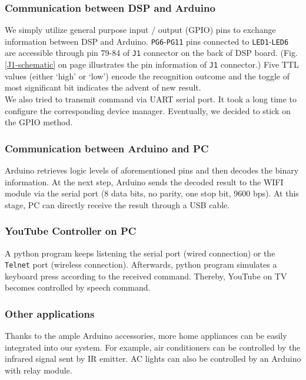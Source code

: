 \subsubsection{Communication between DSP and Arduino}
We simply utilize general purpose input / output (GPIO) pins to exchange information between DSP and Arduino. \texttt{PG6}-\texttt{PG11} pins connected to \texttt{LED1}-\texttt{LED6} are accessible through pin 79-84 of \texttt{J1} connector on the back of DSP board. (Fig. \ref{J1-schematic} on page \pageref{J1-schematic} illustrates the pin information of \texttt{J1} connector.) Five TTL values (either `high' or `low') encode the recognition outcome and the toggle of most significant bit indicates the advent of new result.\\

We also tried to transmit command via UART serial port. It took a long time to configure the corresponding device manager. Eventually, we decided to stick on the GPIO method.

\subsubsection{Communication between Arduino and PC}
Arduino retrieves logic levels of aforementioned pins and then decodes the binary information. At the next step, Arduino sends the decoded result to the WIFI module via the serial port (8 data bits, no parity, one stop bit, 9600 bps). At this stage, PC can directly receive the result through a USB cable.

\subsubsection{YouTube Controller on PC}
A python program keeps listening the serial port (wired connection) or the \texttt{Telnet} port (wireless connection). Afterwards, python program simulates a keyboard press according to the received command. Thereby, YouTube on TV becomes controlled by speech command.

\subsubsection{Other applications}
Thanks to the ample Arduino accessories, more home appliances can be easily integrated into our system. For example, air conditioners can be controlled by the infrared signal sent by IR emitter. AC lights can also be controlled by an Arduino with relay module.

